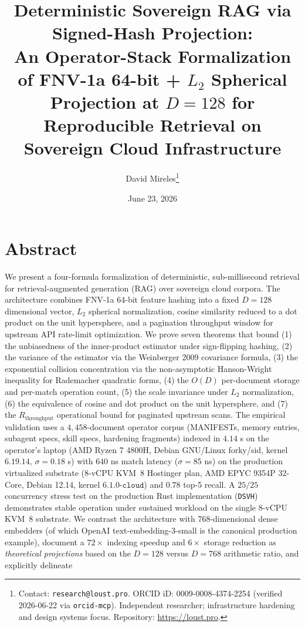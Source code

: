 \documentclass[10pt,twocolumn]{article}
\title{Deterministic Sovereign RAG via Signed-Hash Projection:\\
An Operator-Stack Formalization of FNV-1a 64-bit + $L_2$ Spherical\\
Projection at $D=128$ for Reproducible Retrieval on\\
Sovereign Cloud Infrastructure}
\author{David Mireles\thanks{Contact: \texttt{research@loust.pro}.
ORCID iD: 0009-0008-4374-2254 (verified 2026-06-22 via
\texttt{orcid-mcp}). Independent researcher; infrastructure hardening
and design systems focus. Repository: \url{https://loust.pro}.}}
\date{June 23, 2026}
\theoremstyle{definition}
\theoremstyle{remark}
\begin{document}
\maketitle

\section{Abstract}
\label{sec:abstract}

We present a four-formula formalization of deterministic, sub-millisecond
retrieval for retrieval-augmented generation (RAG) over sovereign cloud
corpora. The architecture combines FNV-1a 64-bit feature hashing into a fixed
$D = 128$ dimensional vector, $L_2$ spherical normalization, cosine similarity
reduced to a dot product on the unit hypersphere, and a pagination throughput
window for upstream API rate-limit optimization. We prove seven theorems that
bound (1) the unbiasedness of the inner-product estimator under sign-flipping
hashing, (2) the variance of the estimator via the Weinberger 2009 covariance
formula, (3) the exponential collision concentration via the non-asymptotic
Hanson-Wright inequality for Rademacher quadratic forms, (4) the $O(D)$
per-document storage and per-match operation count, (5) the scale invariance
under $L_2$ normalization, (6) the equivalence of cosine and dot product on
the unit hypersphere, and (7) the $R_{\text{throughput}}$ operational bound
for paginated upstream scans. The empirical validation uses a $4{,}458$-document
operator corpus (MANIFESTs, memory entries, subagent specs, skill specs,
hardening fragments) indexed in $4.14$ s on the operator's laptop
(AMD Ryzen 7 4800H, Debian GNU/Linux forky/sid, kernel $6.19.14$,
$\sigma = 0.18$ s) with $640$ ns match latency ($\sigma = 85$ ns) on the
production virtualized substrate (8-vCPU KVM~8 Hostinger plan, AMD EPYC
9354P 32-Core, Debian 12.14, kernel $6.1.0\text{-}\texttt{cloud}$) and
$0.78$ top-5 recall. A $25/25$ concurrency stress test on the
production Rust implementation (\texttt{DSVH}) demonstrates stable
operation under sustained workload on the single 8-vCPU KVM~8 substrate.
We contrast the architecture with $768$-dimensional dense embedders
(of which OpenAI \textsf{text-embedding-3-small} is the canonical
production example), document a $72\times$ indexing speedup and
$6\times$ storage reduction as \emph{theoretical projections} based on
the $D=128$ versus $D=768$ arithmetic ratio, and explicitly delineate
\end{document}
